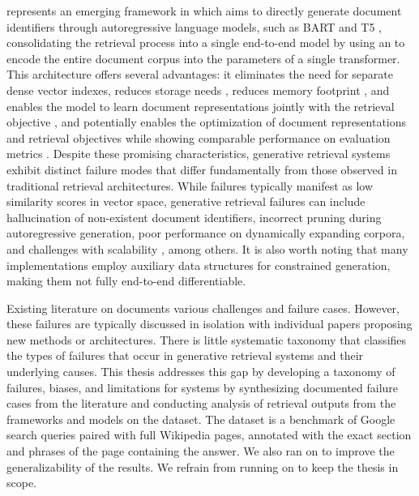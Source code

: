  represents an emerging framework in  which aims to directly generate document identifiers through autoregressive language models, such as BART \cite{lewis-bart-denoising} and T5 \cite{colin-raffel-exploring-the}, consolidating the retrieval process into a single end-to-end model \cite{peitian-zhang-generative-retrieval,xiaoxi-li-from-matching,tzulin-kuo-a-survey} by using an  to encode the entire document corpus into the parameters of a single transformer.
This architecture offers several advantages: it eliminates the need for separate dense vector indexes, reduces storage needs \cite{michele-bevilacqua-autoregressive-search}
, reduces memory footprint \cite{hansi-zeng-planning-ahead}, and enables the model to learn document representations jointly with the retrieval objective \cite{weiwei-sun-learning-to,yubao-tang-listwise-generative}
, and potentially enables the optimization of document representations and retrieval objectives while showing comparable performance on evaluation metrics
\cite{michele-bevilacqua-autoregressive-search,hansi-zeng-planning-ahead,yubao-tang-listwise-generative}.
Despite these promising characteristics, generative retrieval systems exhibit distinct failure modes that differ fundamentally from those observed in traditional retrieval architectures. While  failures typically manifest as low similarity scores in vector space, generative retrieval failures can include hallucination of non-existent document identifiers, incorrect pruning during autoregressive generation, poor performance on dynamically expanding corpora, and challenges with scalability \cite{metzler-rethinking-search,ji-survey-of,hansi-zeng-planning-ahead,ronak-pradeep-how-does}, among others.
It is also worth noting that many  implementations employ auxiliary data structures for constrained generation, making them not fully end-to-end differentiable.

Existing literature on  documents various challenges and failure cases. However, these failures are typically discussed in isolation with individual papers proposing new methods or architectures. There is little systematic taxonomy that classifies the types of failures that occur in generative retrieval systems and their underlying causes.
This thesis addresses this gap by developing a taxonomy of failures, biases, and limitations for  systems by synthesizing documented failure cases from the literature and conducting analysis of retrieval outputs from the frameworks  \cite{michele-bevilacqua-autoregressive-search} and  models \cite{yongqi-li-multiview-identifiers} on the  dataset. The  dataset \cite{kwiatkowski-natural-questions} is a benchmark of Google search queries paired with full Wikipedia pages, annotated with the exact section and phrases of the page containing the answer. We also ran  on  to improve the generalizability of the results. We refrain from running  on  to keep the thesis in scope.

